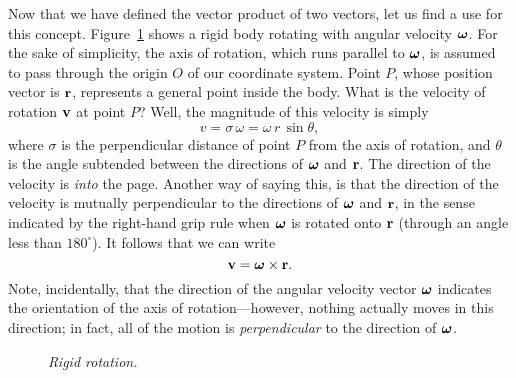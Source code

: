 Now that we have defined the vector product of two vectors, let us find a use for this concept.
Figure~\ref{f72} shows a rigid body rotating with angular velocity $\mbox{\boldmath$\omega$}$. For the
sake of simplicity, the axis of rotation, which runs parallel to $\mbox{\boldmath$\omega$}$, is
assumed to pass through the origin $O$ of our coordinate system. Point $P$, whose position
vector is ${\bf r}$, represents a general point inside the body. What is the velocity
of rotation ${\bf v}$ at point $P$? Well, the magnitude of this velocity is simply
\begin{equation}
v=\sigma\,\omega = \omega\,r\,\sin\theta,
\end{equation}
where $\sigma$ is the perpendicular distance of point $P$ from the axis of rotation, and 
$\theta$ is the angle subtended between the directions of $\mbox{\boldmath$\omega$}$ and ${\bf r}$. 
The direction of the velocity is {\em into} the page. Another way of saying this, is that the
direction of the velocity is mutually perpendicular to the directions of $\mbox{\boldmath$\omega$}$ and
${\bf r}$, in the sense indicated by the right-hand grip rule when $\mbox{\boldmath$\omega$}$ 
is rotated onto ${\bf r}$ (through an angle less than $180^\circ$). It follows that
we can write
\begin{equation}
{\bf v} = \mbox{\boldmath$\omega$}\times {\bf r}.
\end{equation}
Note, incidentally, 
 that the direction of the angular velocity vector $\mbox{\boldmath$\omega$}$ indicates the orientation
of the axis of rotation---however, nothing actually moves in this direction; in fact, all of the motion
is {\em perpendicular} to the direction of $\mbox{\boldmath$\omega$}$.

\begin{figure}
\epsfysize=3in
\centerline{}
\caption{\em Rigid rotation.}\label{f72}  
\end{figure}

